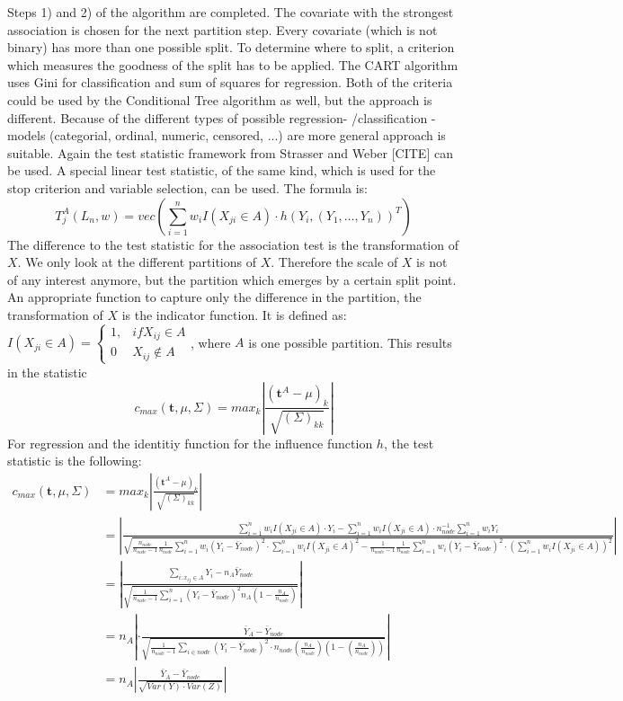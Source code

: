 Steps 1) and 2) of the algorithm are completed. The covariate with the strongest association is chosen for the next partition step. 
Every covariate (which is not binary) has more than one possible split. To determine where to split, a criterion which measures the goodness of the split has to be applied. 
The CART algorithm uses Gini for classification and sum of squares for regression. 
Both of the criteria could be used by the Conditional Tree algorithm as well, but the approach is different. 
Because of the different types of possible regression- /classification - models (categorial, ordinal, numeric, censored, ...) are more general approach is suitable. 
Again the test statistic framework from Strasser and Weber [CITE] can be used. 
A special linear test statistic, of the same kind, which is used for the stop criterion and variable selection, can be used. 
The formula is: \[T_{j}^A(L_n, w) = vec \left( \sum\limits_{i=1}^n w_i I(X_{ji} \in A) \cdot h(Y_i, (Y_1, \dots, Y_n))^T \right)\]
The difference to the test statistic for the association test is the transformation of $X$. We only look at the different partitions of 
$X$. Therefore the scale of $X$ is not of any interest anymore, but the partition which emerges by a certain split point. 
An appropriate function to capture only the difference in the partition, the transformation of $X$ is the indicator function. It is defined as: 
\(I(X_{ji} \in A) = \begin{cases} 1, & if X_{ij} \in A \\ 0 & X_{ij} \not\in A \end{cases}\),  where $A$ is one possible partition. 
This results in the statistic 
\[c_{max}(\mathbf{t}, \mu, \Sigma) = max_{k} \left| \frac{(\mathbf{t}^A-\mu)_k}{\sqrt{(\Sigma)_{kk}}}\right|\]
For regression and the identitiy function for the influence function $h$, the test statistic is the following: 
\begin{align} 
  c_{max}(\mathbf{t}, \mu, \Sigma) & =  max_{k} \left| \frac{(\mathbf{t}^A-\mu)_k}{\sqrt{(\Sigma)_{kk}}}\right| \\
  & = \left| \frac{\sum\limits_{i = 1}^n w_i I(X_{ji} \in A)\cdot Y_i - \sum\limits_{i=1}^n w_i I(X_{ji} \in A) \cdot n_{node}^{-1} \sum\limits_{i=1}^n w_i Y_i}{
    \sqrt{\frac{n_{node}}{n_{node} - 1} \frac{1}{n_{node}} \sum\limits_{i=1}^n w_i (Y_i - \bar{Y}_{node})^2 \cdot \sum\limits_{i=1}^n w_i I(X_{ji} \in A)^2 - \frac{1}{n_{node} - 1}  \frac{1}{n_{node}}\sum\limits_{i=1}^n w_i (Y_i - \bar{Y}_{node})^2 \cdot \left( \sum\limits_{i=1}^n w_i I(X_{ji} \in A)\right)^2} }\right|\\
  & = \left| \frac{\sum\limits_{i: x_{ij} \in A} Y_i - n_{A} \bar{Y}_{node} }{\sqrt{\frac{1}{n_{node} -1} \sum\limits_{i=1}^n (Y_i - \bar{Y}_{node})^2 n_A (1 - \frac{n_A}{n_{node}})} } \right| \\
  & = n_A \left| \cdot  \frac{\bar{Y}_A - \bar{Y}_{node}}{\sqrt{\frac{1}{n_{node} - 1} \sum\limits_{i \in node} (Y_i - \bar{Y}_{node})^2 \cdot n_{node} (\frac{n_A}{n_{node}})(1- (\frac{n_A}{n_{node}}))}}  \right|\\
  & = n_A \left| \frac{\bar{Y}_A - \bar{Y}_{node}}{\sqrt{Var(Y) \cdot Var(Z)}}\right|\\
\end{align} 

